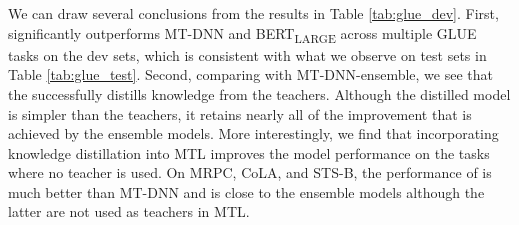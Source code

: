 We can draw several conclusions from the results in Table \ref{tab:glue_dev}. First, {\NMNAME} significantly outperforms MT-DNN and BERT\textsubscript{LARGE} across multiple GLUE tasks on the dev sets, which is consistent with what we observe on test sets in Table \ref{tab:glue_test}. 
Second, comparing {\NMNAME} with MT-DNN-ensemble, we see that the {\NMNAME} successfully distills knowledge from the teachers. Although the distilled model is  simpler than the teachers, it retains nearly all of the improvement that is achieved by the ensemble models. More interestingly, we find that incorporating knowledge distillation into MTL improves the model performance on the tasks where no teacher is used. On MRPC, CoLA, and STS-B, the performance of {\NMNAME} is much better than MT-DNN and is close to the ensemble models although the latter are not used as teachers in MTL.











